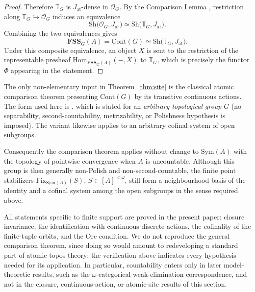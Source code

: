 \documentclass{lmcs}
\newcommand{\Sym}{\mathrm{Sym}}
\newcommand{\Fix}{\mathrm{Fix}}
\newcommand{\FSS}{\mathbf{FSS}}
\newcommand{\Hom}{\mathrm{Hom}}
\begin{document}
\begin{proof}
Therefore $\mathbb T_G$ is $J_{\mathrm{at}}$-dense in $\mathcal O_G$. By the Comparison Lemma \cite[VII.10, Cor.~3]{MacLaneMoerdijk}, restriction along $\mathbb T_G\hookrightarrow\mathcal O_G$ induces an equivalence
\[
   \mathrm{Sh}\bigl(\mathcal O_G,J_{\mathrm{at}}\bigr)
   \simeq
   \mathrm{Sh}\bigl(\mathbb T_G,J_{\mathrm{at}}\bigr).
\]
Combining the two equivalences gives
\[
   \FSS_G(A)
   =\mathrm{Cont}(G)
   \simeq
   \mathrm{Sh}\bigl(\mathbb T_G,J_{\mathrm{at}}\bigr).
\]
Under this composite equivalence, an object $X$ is sent to the restriction of the representable presheaf $\Hom_{\FSS_G(A)}(-,X)$ to $\mathbb T_G$, which is precisely the functor $\Phi$ appearing in the statement.
\end{proof}

\begin{rem} \label{rem:selfcont}
The only non-elementary input in Theorem~\ref{thm:site} is the classical atomic comparison theorem presenting $\mathrm{Cont}(G)$ by its transitive continuous actions. The form used here is \cite[III.9, Thm.~1]{MacLaneMoerdijk}, which is stated for an \emph{arbitrary topological group} $G$ (no separability, second-countability, metrizability, or Polishness hypothesis is imposed). The variant \cite[III.9, Thm.~2]{MacLaneMoerdijk} likewise applies to an arbitrary cofinal system of open subgroups.

Consequently the comparison theorem applies without change to $\Sym(A)$ with the topology of pointwise convergence when $A$ is uncountable.  Although this group is then generally non-Polish and non-second-countable, the finite point stabilizers $\Fix_{\Sym(A)}(S)$, $S\in[A]^{<\omega}$, still form a neighbourhood basis of the identity and a cofinal system among the open subgroups in the sense required above.

All statements specific to finite support are proved in the present paper: closure invariance, the identification with continuous discrete
actions, the cofinality of the finite-tuple orbits, and the Ore condition. We do not reproduce the general comparison theorem, since
doing so would amount to redeveloping a standard part of atomic-topos theory; the verification above indicates every hypothesis needed for its application. In particular, countability enters only in later model-theoretic results, such as the $\omega$-categorical weak-elimination correspondence, and not in the closure, continuous-action, or atomic-site results of this section.
\end{rem}
\end{document}
